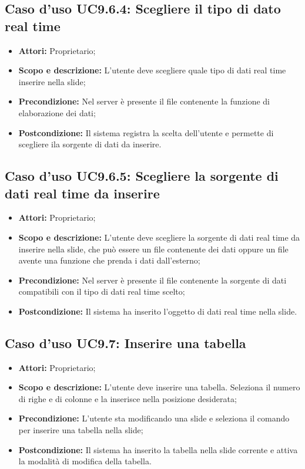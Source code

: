 	\subsection{Caso d'uso UC9.6.4: Scegliere il tipo di dato real time}
	\begin{itemize}
		\item \textbf{Attori:} Proprietario;
		\item \textbf{Scopo e descrizione:} L'utente deve scegliere quale tipo di dati \gls{real time} inserire nella \gls{slide};
		\item \textbf{Precondizione:} Nel server è presente il file contenente la funzione di elaborazione dei dati;
		\item \textbf{Postcondizione:} Il sistema registra la scelta dell'utente e permette di scegliere ila sorgente di dati da inserire.
	\end{itemize}
	
	\subsection{Caso d'uso UC9.6.5: Scegliere la sorgente di dati real time da inserire}
	\begin{itemize}
		\item \textbf{Attori:} Proprietario;
		\item \textbf{Scopo e descrizione:} L'utente deve scegliere la sorgente di dati \gls{real time} da inserire nella \gls{slide}, che può essere un file contenente dei dati oppure un file avente una funzione che prenda i dati dall'esterno;
		\item \textbf{Precondizione:} Nel server è presente il file contenente la sorgente di dati compatibili con il tipo di dati \gls{real time} scelto;
		\item \textbf{Postcondizione:} Il sistema ha inserito l'oggetto di dati \gls{real time} nella \gls{slide}.
	\end{itemize}
	

\subsection{Caso d'uso UC9.7: Inserire una tabella}
\begin{itemize}
	\item \textbf{Attori:} Proprietario;
	\item \textbf{Scopo e descrizione:} L'utente deve inserire una tabella. Seleziona il numero di righe e di colonne e la inserisce nella posizione desiderata;
	\item \textbf{Precondizione:} L'utente sta modificando una \gls{slide} e seleziona il comando per inserire una tabella nella \gls{slide};
	\item \textbf{Postcondizione:} Il sistema ha inserito la tabella nella \gls{slide} corrente e attiva la modalità di modifica della tabella.
\end{itemize}


